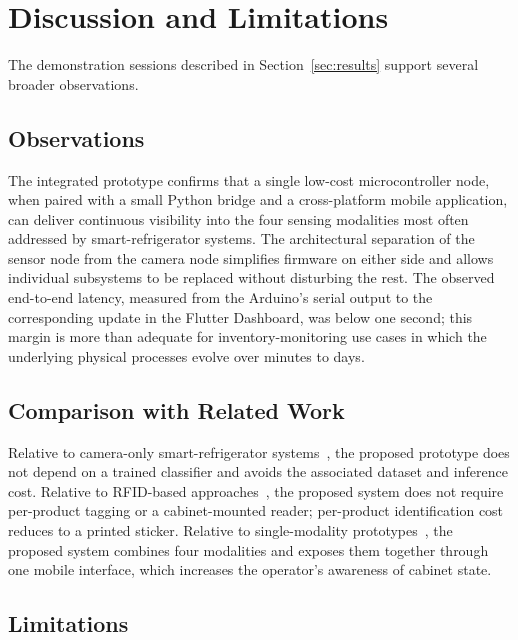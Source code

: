 \section{Discussion and Limitations}
\label{sec:discussion}

The demonstration sessions described in Section~\ref{sec:results}
support several broader observations.

\subsection{Observations}

The integrated prototype confirms that a single low-cost
microcontroller node, when paired with a small Python bridge and a
cross-platform mobile application, can deliver continuous visibility
into the four sensing modalities most often addressed by
smart-refrigerator systems. The architectural separation of the
sensor node from the camera node simplifies firmware on either side
and allows individual subsystems to be replaced without disturbing
the rest. The observed end-to-end latency, measured from the
Arduino's serial output to the corresponding update in the Flutter
Dashboard, was below one second; this margin is more than adequate
for inventory-monitoring use cases in which the underlying physical
processes evolve over minutes to days.

\subsection{Comparison with Related Work}

Relative to camera-only smart-refrigerator
systems~\cite{ericyang2022smartfridge,vadlamudi2025fridgesense}, the
proposed prototype does not depend on a trained classifier and
avoids the associated dataset and inference cost. Relative to
RFID-based approaches~\cite{abhiram2025iotmonitor}, the proposed
system does not require per-product tagging or a cabinet-mounted
reader; per-product identification cost reduces to a printed
sticker. Relative to single-modality
prototypes~\cite{sarawathi2025spoilage,sarkar2024proactive,shetty2024monitoring},
the proposed system combines four modalities and exposes them
together through one mobile interface, which increases the
operator's awareness of cabinet state.

\subsection{Limitations}

